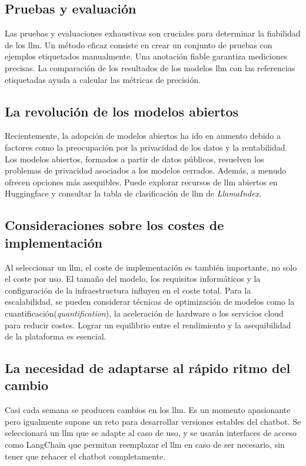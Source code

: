 \subsection{Pruebas y evaluación}
Las pruebas y evaluaciones exhaustivas son cruciales para determinar la fiabilidad de los \acrshort{llm}. Un método eficaz consiste en crear un conjunto de pruebas con ejemplos etiquetados manualmente. Una anotación fiable garantiza mediciones precisas. La comparación de los resultados de los modelos \acrshort{llm} con las referencias etiquetadas ayuda a calcular las métricas de precisión. 

\subsection{La revolución de los modelos abiertos}
Recientemente, la adopción de modelos abiertos ha ido en aumento debido a factores como la preocupación por la privacidad de los datos y la rentabilidad. Los modelos abiertos, formados a partir de datos públicos, resuelven los problemas de privacidad asociados a los modelos cerrados. Además, a menudo ofrecen opciones más asequibles. Puede explorar recursos de \acrshort{llm} abiertos en Huggingface y consultar la tabla de clasificación de \acrshort{llm} de \textit{LlamaIndex}\cite{LlamaIndex}.

\subsection{Consideraciones sobre los costes de implementación}
Al seleccionar un \acrshort{llm}, el coste de implementación es también importante, no solo el coste por uso. El tamaño del modelo, los requisitos informáticos y la configuración de la infraestructura influyen en el coste total. Para la escalabilidad, se pueden considerar técnicas de optimización de modelos como la cuantificación(\textit{quantification}), la aceleración de hardware o los servicios cloud para reducir costes. Lograr un equilibrio entre el rendimiento y la asequibilidad de la plataforma es esencial.

\subsection{La necesidad de adaptarse al rápido ritmo del cambio}
Casi cada semana se producen cambios en los \acrshort{llm}. Es un momento apasionante pero igualmente supone un reto para desarrollar versiones estables del chatbot. Se seleccionará un \acrshort{llm} que se adapte al caso de uso, y se usarán interfaces de acceso como LangChain que permitan reemplazar el \acrshort{llm} en caso de ser necesario, sin tener que rehacer el chatbot completamente.


